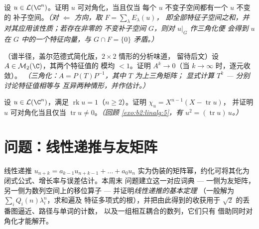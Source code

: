 \begin{exercise}[$\star\star\star$]\label{exo:b2:reduction:10}
设 $u \in \mathcal{L}(\C^n)$。证明 $u$ 可对角化，当且仅当
每个 $u$ 不变子空间都有一个 $u$ 不变的
补子空间。\emph{（对 $\Leftarrow$ 方向，取 $F = \sum_\lambda E_\lambda(u)$，
即全部特征子空间之和，并对其应用该性质；若存在非零的
不变补子空间 $G$，则对 $u|_G$ 作三角化便
会得到 $u$ 在 $G$ 中的一个特征向量，与 $G \cap
F = \{0\}$ 矛盾。）}
\end{exercise}

\begin{exercise}[$\star\star\star$]\label{exo:b2:reduction:11}
（谱半径，盖尔范德式简化版，$2\times2$ 情形的分析味道，
留待后文）设 $A \in \mathcal{M}_2(\C)$，其两个特征值的
模均 $< 1$。证明 $A^k \to 0$（当 $k \to \infty$ 时，逐元收敛）。
\emph{（三角化：$A = P(T)P^{-1}$，其中 $T$ 为上三角矩阵；
显式计算 $T^k$ --- 分别讨论特征值相等与
互异两种情形，并作估计。）}
\end{exercise}

\begin{exercise}[$\star\star$]\label{exo:b2:reduction:12}
设 $u \in \mathcal{L}(\C^n)$，满足 $\operatorname{rk} u = 1$（$n
\geq 2$）。证明 $\chi_u = X^{n-1}(X - \operatorname{tr} u)$，
并证明 $u$ 可对角化当且仅当 $\operatorname{tr} u
\neq 0$。\emph{（回顾 \cref{exo:b2:linalg:5}，有 $u^2 =
(\operatorname{tr} u)\,u$。）}
\end{exercise}

\section{问题：线性递推与友矩阵}

线性递推 $u_{n+k} = a_{k-1}u_{n+k-1} + \dots + a_0 u_n$
实为伪装的矩阵幂，约化可将其化为
闭式公式、增长率与误差估计。本周末
问题建立这一对应词典 --- 一侧为友矩阵，
另一侧为数列空间上的移位算子
--- 并证明\emph{线性递推的基本定理}
（一般解为 $\sum_i Q_i(n)\lambda_i^n$，求和遍及
特征多项式的根），并把由此得到的收获用于
$\sqrt2$ 的丢番图逼近、路径与单词的计数，
以及一组相互耦合的数列，它们只有
借助同时对角化才能解开。

